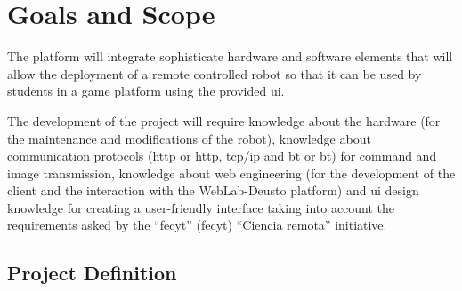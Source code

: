 \chapter{Goals and Scope}

The platform will integrate sophisticate hardware and software elements that will allow the
deployment of a remote controlled robot so that it can be used by students in a game platform using
the provided \acrlong{ui}.

The development of the project will require knowledge about the hardware (for the maintenance and
modifications of the robot), knowledge about communication protocols (\acrlong{http} or
\acrshort{http}, \acrshort{tcp}/\acrshort{ip} and \acrlong{bt} or \acrshort{bt}) for command and
image transmission, knowledge about web engineering (for the development of the client and the
interaction with the WebLab-Deusto platform) and \acrlong{ui} design knowledge for creating a
user-friendly interface taking into account the requirements asked by the ``\acrlong{fecyt}''
(\acrshort{fecyt}) ``Ciencia remota'' initiative.

\section{Project Definition}

